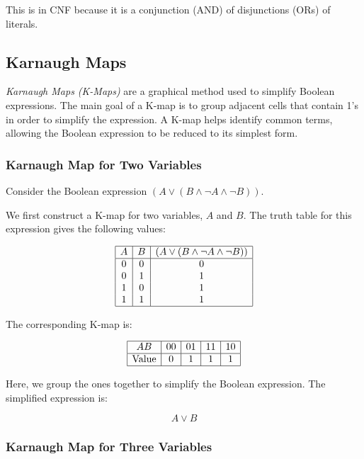 This is in CNF because it is a conjunction (AND) of disjunctions (ORs) of literals.

\subsection{Karnaugh Maps}

\emph{Karnaugh Maps (K-Maps)} are a graphical method used to simplify Boolean expressions. 
The main goal of a K-map is to group adjacent cells that contain 1's in order to simplify the expression. 
A K-map helps identify common terms, allowing the Boolean expression to be reduced to its simplest form.

\subsubsection{Karnaugh Map for Two Variables}

Consider the Boolean expression \( (A \lor (B \land \neg A \land \neg B)) \).
\vspace{\baselineskip}

We first construct a K-map for two variables, \( A \) and \( B \). The truth table for this expression 
gives the following values:

\[
	\begin{array}{|c|c|c|}
		\hline
		A & B & (A \lor (B \land \neg A \land \neg B)) \\
		\hline
		0 & 0 & 0                                      \\
		0 & 1 & 1                                      \\
		1 & 0 & 1                                      \\
		1 & 1 & 1                                      \\
		\hline
	\end{array}
\]

The corresponding K-map is:

\[
	\begin{array}{|c|c|c|c|c|}
		\hline
		AB           & 00 & 01 & 11 & 10 \\
		\hline
		\text{Value} & 0  & 1  & 1  & 1  \\
		\hline
	\end{array}
\]

Here, we group the ones together to simplify the Boolean expression. The simplified expression is:

\[
	A \lor B
\]

\subsubsection{Karnaugh Map for Three Variables}

